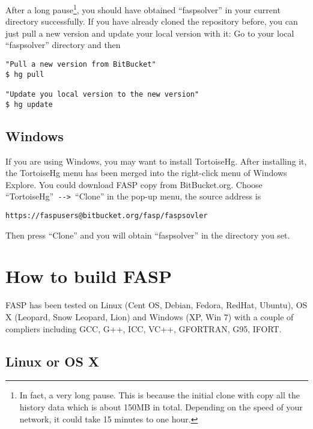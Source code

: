 \documentclass[11pt]{memoir}
\begin{document}
After a long pause\footnote{In fact, a very long pause. This is because the initial clone with copy all the history data which is about 150MB in total. Depending on the speed of your network, it could take 15 minutes to one hour.}, you should have obtained ``faspsolver'' in your current directory successfully. If you have already cloned the repository before, you can just pull a new version and update your local version with it: Go to your local ``faspsolver'' directory and then
%
\begin{lstlisting}[numbers=none]
"Pull a new version from BitBucket"
$ hg pull

"Update you local version to the new version"
$ hg update
\end{lstlisting}
%

\subsection{Windows}
If you are using Windows, you may want to install TortoiseHg. After installing it, the TortoiseHg menu has been merged into the right-click menu of Windows Explore. You could download FASP copy from BitBucket.org. Choose ``TortoiseHg''\verb| --> |``Clone'' in the pop-up menu, the source address is
\begin{lstlisting}[numbers=none]
https://faspusers@bitbucket.org/fasp/faspsovler
\end{lstlisting}
Then press ``Clone'' and you will obtain ``faspsolver'' in the directory you set.


\section{How to build FASP}\label{sec:build}

FASP has been tested on Linux (Cent OS, Debian, Fedora, RedHat, Ubuntu), OS X (Leopard, Snow Leopard, Lion) and Windows (XP, Win 7) with a couple of compliers including GCC, G++, ICC, VC++, GFORTRAN, G95, IFORT.

\subsection{Linux or OS X}
\end{document}
